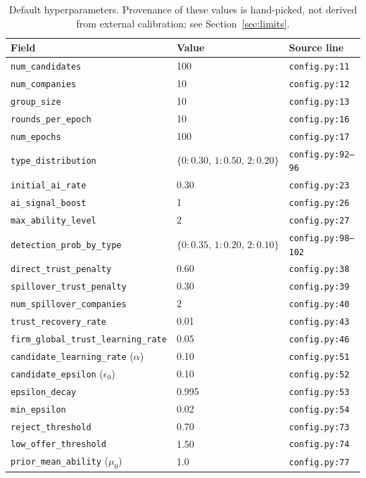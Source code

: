 \documentclass[11pt]{article}
\begin{document}
\begin{table}[h]
\centering
\small
\begin{tabular}{@{}lll@{}}
\toprule
Field & Value & Source line \\
\midrule
\texttt{num\_candidates} & 100 & \texttt{config.py:11} \\
\texttt{num\_companies} & 10 & \texttt{config.py:12} \\
\texttt{group\_size} & 10 & \texttt{config.py:13} \\
\texttt{rounds\_per\_epoch} & 10 & \texttt{config.py:16} \\
\texttt{num\_epochs} & 100 & \texttt{config.py:17} \\
\texttt{type\_distribution} & \(\{0{:}0.30,\,1{:}0.50,\,2{:}0.20\}\) & \texttt{config.py:92--96} \\
\texttt{initial\_ai\_rate} & 0.30 & \texttt{config.py:23} \\
\texttt{ai\_signal\_boost} & 1 & \texttt{config.py:26} \\
\texttt{max\_ability\_level} & 2 & \texttt{config.py:27} \\
\texttt{detection\_prob\_by\_type} & \(\{0{:}0.35,\,1{:}0.20,\,2{:}0.10\}\) & \texttt{config.py:98--102} \\
\texttt{direct\_trust\_penalty} & 0.60 & \texttt{config.py:38} \\
\texttt{spillover\_trust\_penalty} & 0.30 & \texttt{config.py:39} \\
\texttt{num\_spillover\_companies} & 2 & \texttt{config.py:40} \\
\texttt{trust\_recovery\_rate} & 0.01 & \texttt{config.py:43} \\
\texttt{firm\_global\_trust\_learning\_rate} & 0.05 & \texttt{config.py:46} \\
\texttt{candidate\_learning\_rate} (\(\alpha\)) & 0.10 & \texttt{config.py:51} \\
\texttt{candidate\_epsilon} (\(\epsilon_{0}\)) & 0.10 & \texttt{config.py:52} \\
\texttt{epsilon\_decay} & 0.995 & \texttt{config.py:53} \\
\texttt{min\_epsilon} & 0.02 & \texttt{config.py:54} \\
\texttt{reject\_threshold} & 0.70 & \texttt{config.py:73} \\
\texttt{low\_offer\_threshold} & 1.50 & \texttt{config.py:74} \\
\texttt{prior\_mean\_ability} (\(\mu_{0}\)) & 1.0 & \texttt{config.py:77} \\
\bottomrule
\end{tabular}
\caption{Default hyperparameters. Provenance of these values is hand-picked,
not derived from external calibration; see Section~\ref{sec:limits}.}
\label{tab:hp}
\end{table}
\end{document}
